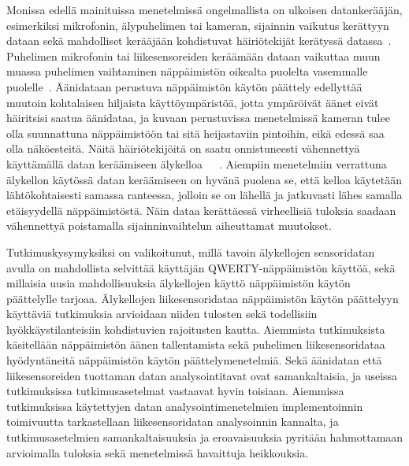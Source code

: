 \documentclass[finnish]{tktltiki2}
\theoremstyle{definition}
\theoremstyle{remark}
\begin{document}
Monissa edellä mainituissa menetelmissä ongelmallista on ulkoisen datankerääjän, esimerkiksi mikrofonin, älypuhelimen tai kameran, sijainnin vaikutus kerättyyn dataan sekä mahdolliset kerääjään kohdistuvat häiriötekijät kerätyssä datassa~\cite{berger}. Puhelimen mikrofonin tai liikesensoreiden keräämään dataan vaikuttaa muun muassa puhelimen vaihtaminen näppäimistön oikealta puolelta vasemmalle puolelle~\cite{mar}. Äänidataan perustuva näppäimistön käytön päättely edellyttää muutoin kohtalaisen hiljaista käyttöympäristöä, jotta ympäröivät äänet eivät häiritsisi saatua äänidataa, ja kuvaan perustuvissa menetelmissä kameran tulee olla suunnattuna näppäimistöön tai sitä heijastaviin pintoihin, eikä edessä saa olla näköesteitä. Näitä häiriötekijöitä on saatu onnistuneesti vähennettyä käyttämällä datan keräämiseen älykelloa~\cite{liu}~\cite{maiti}~\cite{mole}. Aiempiin menetelmiin verrattuna älykellon käytössä datan keräämiseen on hyvänä puolena se, että kelloa käytetään lähtökohtaisesti samassa ranteessa, jolloin se on lähellä ja jatkuvasti lähes samalla etäisyydellä näppäimistöstä. Näin dataa kerättäessä virheellisiä tuloksia saadaan vähennettyä poistamalla sijainninvaihtelun aiheuttamat muutokset. 

Tutkimuskysymyksiksi on valikoitunut, millä tavoin älykellojen sensoridatan avulla on mahdollista selvittää käyttäjän QWERTY-näppäimistön käyttöä, sekä millaisia uusia mahdollisuuksia älykellojen käyttö näppäimistön käytön päättelylle tarjoaa. Älykellojen liikesensoridataa näppäimistön käytön päättelyyn käyttäviä tutkimuksia arvioidaan niiden tulosten sekä todellisiin hyökkäystilanteisiin kohdistuvien rajoitusten kautta. Aiemmista tutkimuksista käsitellään näppäimistön äänen tallentamista sekä puhelimen liikesensoridataa hyödyntäneitä näppäimistön käytön päättelymenetelmiä. Sekä äänidatan että liikesensoreiden tuottaman datan analysointitavat ovat samankaltaisia, ja useissa tutkimuksissa tutkimusasetelmat vastaavat hyvin toisiaan. Aiemmissa tutkimuksissa käytettyjen datan analysointimenetelmien implementoinnin toimivuutta tarkastellaan liikesensoridatan analysoinnin kannalta, ja tutkimusasetelmien samankaltaisuuksia ja eroavaisuuksia pyritään hahmottamaan arvioimalla tuloksia sekä menetelmissä havaittuja heikkouksia.
\end{document}
